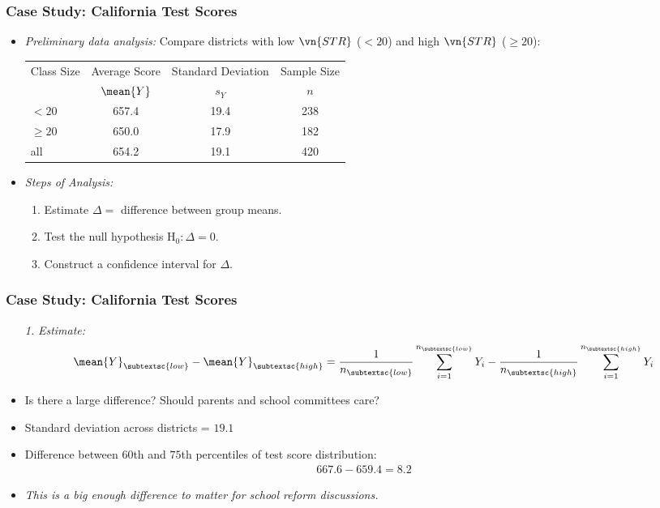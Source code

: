 \begin{frame}
\frametitle{Case Study: California Test Scores}
\begin{itemize}
\item \emph{Preliminary data analysis:} 
\medskip\newlineqquad
Compare districts with low $\vn{STR}$ ($< 20$) and high $\vn{STR}$ ($\geq 20$):
\begin{center}\bigskip
\begin{tabular*}{0.7\linewidth}{lccc} 
\toprule
Class Size &  Average Score & Standard Deviation & Sample Size \\
           &      $\mean{Y}$ &            $s_{Y}$ &  $n$ \\
\midrule
  $<20$    &          657.4 &               19.4 & 238 \\
$\geq 20$  &          650.0 &               17.9 & 182 \\ 
 \quad all &          654.2 &               19.1 & 420 \\
\bottomrule
\end{tabular*}
\end{center}\bigskip
\item \emph{Steps of Analysis:}
\begin{enumerate}
\item Estimate $\Delta =$ difference between group means.
\item Test the null hypothesis H$_{0}\colon\Delta = 0$.
\item Construct a confidence interval for $\Delta$.
\end{enumerate}
\end{itemize}
\end{frame}


\begin{frame}
\frametitle{Case Study: California Test Scores}
\begin{itemize}
\item[\emph{1.}] \emph{Estimate:} 
\begin{align*}
\mean{Y}_{\subtextsc{low}} - \mean{Y}_{\subtextsc{high}} 
= \frac{1}{n_{\subtextsc{low}}} \sum_{i=1}^{n_{\subtextsc{low}}} Y_{i}
- \frac{1}{n_{\subtextsc{high}}} \sum_{i=1}^{n_{\subtextsc{high}}} Y_{i}
\end{align*}
\item Is there a large difference? Should parents and school committees care?
\item Standard deviation across districts = $19.1$
\item Difference between $60$th and $75$th percentiles of test score distribution: 
\begin{align*}
667.6 - 659.4 = 8.2
\end{align*}
\item \emph{This is a big enough difference to matter for school reform discussions.}
\end{itemize}
\end{frame}


